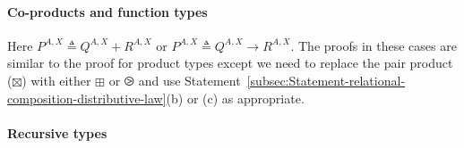 \paragraph{Co-products and function types}

Here $P^{A,X}\triangleq Q^{A,X}+R^{A,X}$ or $P^{A,X}\triangleq Q^{A,X}\rightarrow R^{A,X}$.
The proofs in these cases are similar to the proof for product types
except we need to replace the pair product ($\boxtimes$) with either
$\boxplus$ or $\ogreaterthan$ and use Statement~\ref{subsec:Statement-relational-composition-distributive-law}(b)
or (c) as appropriate.

\paragraph{Recursive types}

